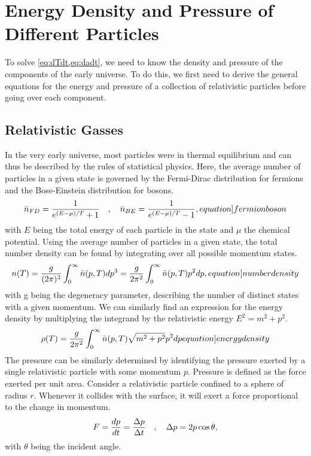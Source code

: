 

\section{Energy Density and Pressure of Different Particles}
To solve \cref{eq:dTdt,eq:dadt}, we need to know the density and pressure of the components of the early universe. To do this, we first need to derive the general equations for the energy and pressure of a collection of relativistic particles before going over each component.

\subsection{Relativistic Gasses}
In the very early universe, most particles were in thermal equilibrium and can thus be described by the rules of statistical physics. Here, the average number of particles in a given state is governed by the Fermi-Dirac distribution for fermions and the Bose-Einstein distribution for bosons.
\begin{align}
    \bar{n}_{FD}=\frac{1}{e^{(E-\mu)/T}+1} \eqsep   \bar{n}_{BE}=\frac{1}{e^{(E-\mu)/T}-1},
    \label[equation]{fermionboson}
\end{align}
with $E$ being the total energy of each particle in the state and $\mu$ the chemical potential. Using the average number of particles in a given state, the total number density can be found by integrating over all possible momentum states. 
\begin{align}
    n(T)=\frac{g}{(2\pi)^3}\int_{0}^{\infty}\bar{n}(p,T)dp^3=\frac{g}{2\pi^2}\int_{0}^{\infty}\bar{n}(p,T) p^2 dp,
    \label[equation]{numberdensity}
\end{align}
with g being the degeneracy parameter, describing the number of distinct states with a given momentum. We can similarly find an expression for the energy density by multiplying the integrand by the relativistic energy $E^2=m^2+p^2$.
\begin{align}
    \rho(T)=\frac{g}{2\pi^2}\int_{0}^{\infty}\bar{n}(p,T)\sqrt{m^2+p^2} p^2 dp
    \label[equation]{energydensity}
\end{align}
The pressure can be similarly determined by identifying the pressure exerted by a single relativistic particle with some momentum $p$.
Pressure is defined as the force exerted per unit area. Consider a relativistic particle confined to a sphere of radius $r$. Whenever it collides with the surface, it will exert a force proportional to the change in momentum. 
\begin{align}
    F=\frac{dp}{dt}=\frac{\Delta p }{\Delta t}\quad , \quad
    \Delta p = 2p \cos \theta,
    \label{eq:pressureF}
\end{align}
with $\theta$ being the incident angle. 

